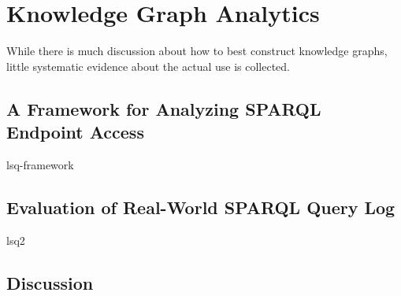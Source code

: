 \chapter{Knowledge Graph Analytics}
While there is much discussion about how to best construct knowledge graphs, little systematic evidence
about the actual use is collected.

%
%

\section{A Framework for Analyzing SPARQL Endpoint Access}
{
\let\section\subsection
\let\subsection\subsubsection
{lsq-framework}
}

\section{Evaluation of Real-World SPARQL Query Log}
{
\let\section\subsection
\let\subsection\subsubsection
{lsq2}
}

\section{Discussion}

